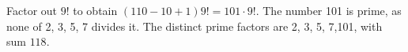 Factor out $9!$ to obtain $(110-10+1)9!=101\cdot9!$. The number 101 is prime, as none of 2, 3, 5, 7 divides it. The distinct prime factors are 2, 3, 5, 7,101, with sum $\boxed{118}$.
